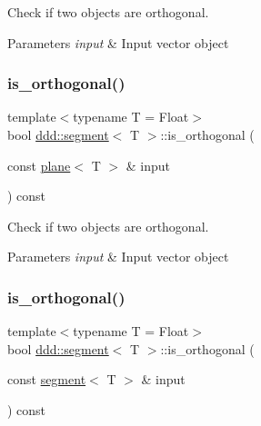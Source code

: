 Check if two objects are orthogonal. 


\begin{DoxyParams}{Parameters}
{\em input} & Input vector object \\
\hline
\end{DoxyParams}
\mbox{\label{classddd_1_1segment_af4d15c7cefba6477b86f3103b3d6d340}} 
\subsubsection{\texorpdfstring{is\+\_\+orthogonal()}{is\_orthogonal()}\hspace{0.1cm}{\footnotesize\ttfamily [4/5]}}
{\footnotesize\ttfamily template$<$typename T = Float$>$ \\
bool \hyperlink{classddd_1_1segment}{ddd\+::segment}$<$ T $>$\+::is\+\_\+orthogonal (\begin{DoxyParamCaption}\item[{const \hyperlink{classddd_1_1plane}{plane}$<$ T $>$ \&}]{input }\end{DoxyParamCaption}) const\hspace{0.3cm}{\ttfamily [inline]}}



Check if two objects are orthogonal. 


\begin{DoxyParams}{Parameters}
{\em input} & Input vector object \\
\hline
\end{DoxyParams}
\mbox{\label{classddd_1_1segment_a9751dcbeabce6f092543f6799b822c02}} 
\subsubsection{\texorpdfstring{is\+\_\+orthogonal()}{is\_orthogonal()}\hspace{0.1cm}{\footnotesize\ttfamily [5/5]}}
{\footnotesize\ttfamily template$<$typename T = Float$>$ \\
bool \hyperlink{classddd_1_1segment}{ddd\+::segment}$<$ T $>$\+::is\+\_\+orthogonal (\begin{DoxyParamCaption}\item[{const \hyperlink{classddd_1_1segment}{segment}$<$ T $>$ \&}]{input }\end{DoxyParamCaption}) const\hspace{0.3cm}{\ttfamily [inline]}}



